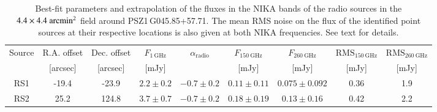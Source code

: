 \documentclass[traditabstract]{aa}
\begin{document}
\begin{table}[h]
\begin{center}
\begin{tabular}{ccccccccc}
\hline
\hline
Source & R.A. offset & Dec. offset & $F_{\mathrm{1~GHz}}$ & $\alpha_{\mathrm{radio}}$ & $F_{\mathrm{150~GHz}}$ & $F_{\mathrm{260~GHz}}$ & $\mathrm{RMS_{150~GHz}}$ & $\mathrm{RMS_{260~GHz}}$\\
 & [arcsec] & [arcsec] & [mJy] &  & [mJy] & [mJy] & [mJy] & [mJy]\\
\hline
RS1 & -19.4 & -23.9 & $2.2 \pm 0.2$ & $-0.7 \pm 0.2$ & $0.11 \pm 0.11$ & $0.075 \pm 0.092$ & 0.36 & 1.9\\
RS2 & 25.2 & 124.8 & $3.7 \pm 0.7$ & $-0.7 \pm 0.2$ & $0.18 \pm 0.19$ & $0.13 \pm 0.16$ & 0.42 & 2.2\\
\hline
\hline
\end{tabular}
\end{center}
\caption{{\footnotesize Best-fit parameters and extrapolation of the fluxes in the NIKA bands of the radio sources in the $4.4 \times 4.4 ~\rm{arcmin^2}$ field around \mbox{PSZ1\,G045.85+57.71}. The mean RMS noise on the flux of the identified point sources at their respective locations is also given at both NIKA frequencies. See text for details.}}
\label{tab:Radio_ps_flux}
\end{table}
\end{document}
